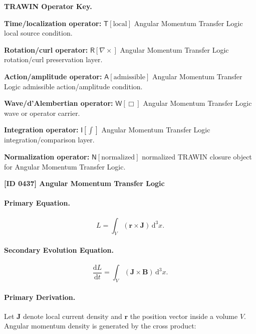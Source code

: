 \par\vspace{0.45\baselineskip}
\noindent\begin{minipage}[t]{\linewidth}
\begingroup
\small
\raggedright
\textbf{TRAWIN Operator Key.}\par
\noindent\textbf{Time/localization operator:} $\mathsf{T}\!\left[\mathrm{local}\right]$ Angular Momentum Transfer Logic local source condition.\par
\noindent\textbf{Rotation/curl operator:} $\mathsf{R}\!\left[\nabla\times\right]$ Angular Momentum Transfer Logic rotation/curl preservation layer.\par
\noindent\textbf{Action/amplitude operator:} $\mathsf{A}\!\left[\mathrm{admissible}\right]$ Angular Momentum Transfer Logic admissible action/amplitude condition.\par
\noindent\textbf{Wave/d'Alembertian operator:} $\mathsf{W}\!\left[\Box\right]$ Angular Momentum Transfer Logic wave or operator carrier.\par
\noindent\textbf{Integration operator:} $\mathsf{I}\!\left[\int\right]$ Angular Momentum Transfer Logic integration/comparison layer.\par
\noindent\textbf{Normalization operator:} $\mathsf{N}\!\left[\mathrm{normalized}\right]$ normalized TRAWIN closure object for Angular Momentum Transfer Logic.\par
\endgroup
\end{minipage}

\clearpage
\noindent\textbf{[ID 0437] Angular Momentum Transfer Logic}\par
\vspace{0.35em}
\paragraph{Primary Equation.}
\begin{equation}
L
=
\int_V
(\mathbf{r}\times\mathbf{J})
\,\mathrm{d}^3x .
\end{equation}

\paragraph{Secondary Evolution Equation.}
\begin{equation}
\frac{\mathrm{d}L}{\mathrm{d}t}
=
\int_V
(\mathbf{J}\times\mathbf{B})
\,\mathrm{d}^3x .
\end{equation}

\paragraph{Primary Derivation.}
Let $\mathbf{J}$ denote local current density and $\mathbf{r}$ the position vector inside a volume $V$.  
Angular momentum density is generated by the cross product:

